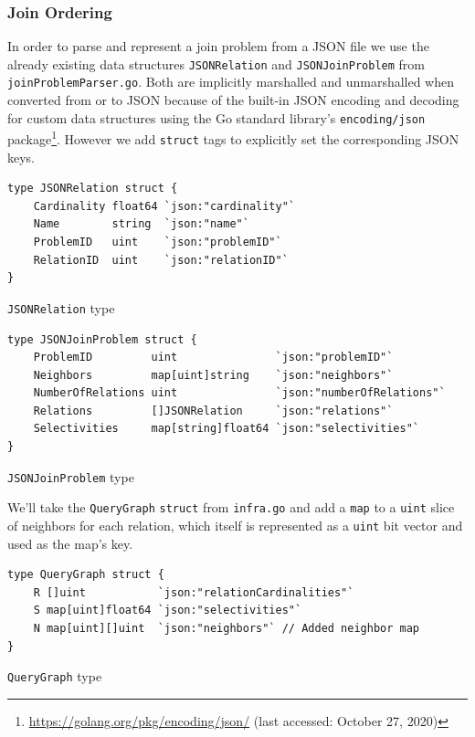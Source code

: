 \subsubsection{Join Ordering}
In order to parse and represent a join problem from a JSON file we use the already existing data structures \texttt{JSONRelation} and \texttt{JSONJoinProblem} from \texttt{joinProblemParser.go}. Both are implicitly marshalled and unmarshalled when converted from or to JSON because of the built-in JSON encoding and decoding for custom data structures using the Go standard library's \texttt{encoding/json} package\footnote{\url{https://golang.org/pkg/encoding/json/} (last accessed: October 27, 2020)}. However we add \texttt{struct} tags to explicitly set the corresponding JSON keys.
\vspace{0.2cm}

\begin{code}
\begin{verbatim}
type JSONRelation struct {
    Cardinality float64 `json:"cardinality"`
    Name        string  `json:"name"`
    ProblemID   uint    `json:"problemID"`
    RelationID  uint    `json:"relationID"`
}
\end{verbatim}
\caption{\texttt{JSONRelation} type}
\end{code}
\vspace{0.2cm}

\begin{code}
\begin{verbatim}
type JSONJoinProblem struct {
    ProblemID         uint               `json:"problemID"`
    Neighbors         map[uint]string    `json:"neighbors"`
    NumberOfRelations uint               `json:"numberOfRelations"`
    Relations         []JSONRelation     `json:"relations"`
    Selectivities     map[string]float64 `json:"selectivities"`
}
\end{verbatim}
\caption{\texttt{JSONJoinProblem} type}
\end{code}
\vspace{0.8cm}

We'll take the \texttt{QueryGraph} \texttt{struct} from \texttt{infra.go} and add a \texttt{map} to a \texttt{uint} slice of neighbors for each relation, which itself is represented as a \texttt{uint} bit vector and used as the map's key.

\begin{code}
\begin{verbatim}
type QueryGraph struct {
	R []uint           `json:"relationCardinalities"`
	S map[uint]float64 `json:"selectivities"`
	N map[uint][]uint  `json:"neighbors"` // Added neighbor map
}
\end{verbatim}
\caption{\texttt{QueryGraph} type}
\end{code}
\vspace{0.8cm}

